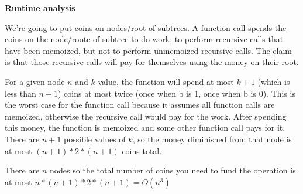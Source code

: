 \documentclass[11pt]{article}
\begin{document}
\textbf{Runtime analysis}

We're going to put coins on nodes/root of subtrees.
A function call spends the coins on the node/roote of subtree to do work, to perform recursive calls that have been memoized, but not to perform unmemoized recursive calls.
The claim is that those recursive calls will pay for themselves using the money on their root.

For a given node $n$ and $k$ value, the function will spend at most $k+1$ (which is less than $n+1$) coins at most twice (once when b is 1, once when b is 0). This is the worst case for the function call because it assumes all function calls are memoized, otherwise the recursive call would pay for the work.
After spending this money, the function is memoized and some other function call pays for it.
There are $n+1$ possible values of $k$, so the money diminished from that node is at most $(n+1)*2*(n+1)$ coins total.

There are $n$ nodes so the total number of coins you need to fund the operation is at most $n*(n+1)*2*(n+1) = O(n^3)$
\end{document}
